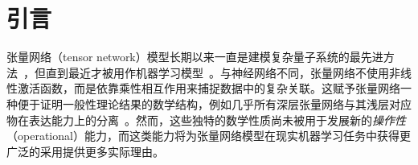 \documentclass[twoside]{article}
\begin{document}


\begin{abstract}

张量网络（tensor network）是为计算多体物理发展起来的一种强大建模框架，近年来才开始被应用于机器学习。本文利用均匀矩阵乘积态（uniform matrix product state, u-MPS）模型对序列数据进行概率建模。我们首先证明 u-MPS 支持序列级并行，长度为 $n$ 的序列可以以 $O(\log n)$ 的深度完成求值。随后我们提出一种新颖的生成式算法，使训练好的 u-MPS 能够从多种多样的条件分布中高效采样，其中每个分布都由一个正则表达式（regular expression）定义。该算法的特例对应自回归采样与填空采样，而更复杂的正则表达式则能以神经生成模型中没有直接对应物的方式生成结构丰富的数据。在合成与真实文本数据上的序列建模实验表明，u-MPS 优于多种基线模型，并在数据有限的情况下有效泛化其预测。

\end{abstract}

\section{引言}
\label{sec:intro}

张量网络（tensor network）模型长期以来一直是建模复杂量子系统的最先进方法~\citep{white1992, fannes1992, orus2019}，但直到最近才被用作机器学习模型~\citep{novikov2015, cohen2016, stoudenmire2016, novikov2017, han2018, stoudenmire2018, cheng2019}。与神经网络不同，张量网络不使用非线性激活函数，而是依靠乘性相互作用来捕捉数据中的复杂关联。这赋予张量网络一种便于证明一般性理论结果的数学结构，例如几乎所有深层张量网络与其浅层对应物在表达能力上的分离~\citep{cohen2016}。然而，这些独特的数学性质尚未被用于发展新的\emph{操作性}（operational）能力，而这类能力将为张量网络模型在现实机器学习任务中获得更广泛的采用提供更多实际理由。
\end{document}

